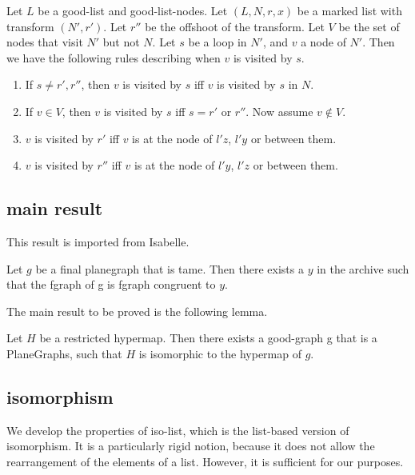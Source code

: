 \begin{lemma}
Let $L$ be a good-list and good-list-nodes.
Let $(L,N,r,x)$ be a marked list with transform $(N',r')$.  Let $r''$ be the offshoot of the transform.
Let $V$ be the set of nodes that visit $N'$ but not $N$.
Let $s$ be a loop in $N'$, and $v$ a node of $N'$.  Then we have the following
rules describing when $v$ is visited by $s$.
\begin{enumerate}
\item If $s\ne r',r''$, then $v$ is visited by $s$ iff $v$ is visited by $s$ in $N$.  
\item If $v\in V$, then $v$ is visited by $s$ iff $s = r'$ or $r''$.  Now assume $v\not\in V$.
\item $v$ is visited by $r'$ iff $v$ is at the node of $l'z$, $l'y$ or between them.
\item $v$ is visited by $r''$ iff $v$ is at the node of $l'y$, $l'z$ or between them.
\end{enumerate}
\end{lemma}


\subsection{main result}

This result is imported from Isabelle.

\begin{theorem}  Let $g$ be a final
planegraph that is tame.  Then there exists a $y$ in the archive such
that the fgraph of g is fgraph congruent to $y$.
\end{theorem}

The main result to be proved is the following lemma.

\begin{lemma}[LSKOKJE]  Let $H$ be a restricted hypermap.  Then there exists a good-graph g that is a PlaneGraphs,
such that $H$ is isomorphic to the hypermap of $g$.
\end{lemma}

\subsection{isomorphism}


We develop the properties of iso-list, which is the list-based version of isomorphism.
It is a particularly rigid notion, because it does not allow the rearrangement of the elements of a list.
However, it is sufficient for our purposes.

